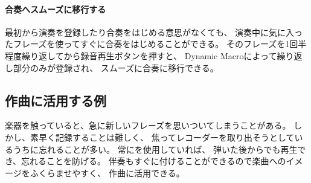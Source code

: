\paragraph*{合奏へスムーズに移行する}
最初から演奏を登録したり合奏をはじめる意思がなくても、
演奏中に気に入ったフレーズを使ってすぐに合奏をはじめることができる。
そのフレーズを1回半程度繰り返してから録音再生ボタンを押すと、
Dynamic Macroによって繰り返し部分のみが登録され、
スムーズに合奏に移行できる。

\subsection{作曲に活用する例}
楽器を触っていると、急に新しいフレーズを思いついてしまうことがある。
しかし、素早く記録することは難しく、
焦ってレコーダーを取り出そうとしているうちに忘れることが多い。
常に{\system}を使用していれば、
弾いた後からでも再生でき、忘れることを防げる。
伴奏もすぐに付けることができるので楽曲へのイメージをふくらませやすく、
作曲に活用できる。
